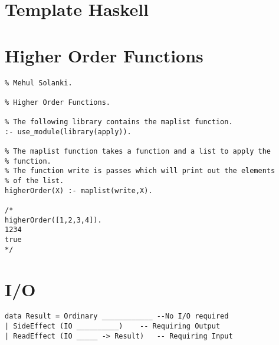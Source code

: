 \documentclass[thesis-solanki.tex]{subfiles}
\begin{document}
\section{Template Haskell}



\section{Higher Order Functions}

\begin{verbatim}
% Mehul Solanki.

% Higher Order Functions.

% The following library contains the maplist function.
:- use_module(library(apply)).

% The maplist function takes a function and a list to apply the 
% function.
% The function write is passes which will print out the elements 
% of the list.
higherOrder(X) :- maplist(write,X).

/*
higherOrder([1,2,3,4]).
1234
true
*/
\end{verbatim}




\section{I/O}

\begin{verbatim}
data Result = Ordinary ____________ --No I/O required
| SideEffect (IO __________) 	-- Requiring Output
| ReadEffect (IO _____ -> Result) 	-- Requiring Input	

\end{verbatim}


\end{document}
